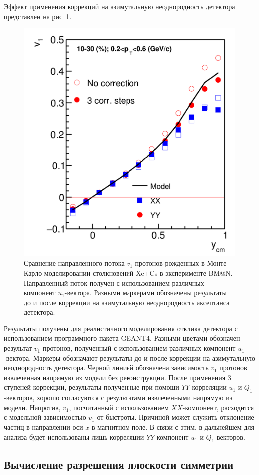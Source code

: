 Эффект применения коррекций на азимутальную неоднородность детектора представлен на рис~\ref{fig:bmn_components}.
%
\begin{figure}[ht]
\begin{center}
\includegraphics[width=0.45\linewidth]{images/v1_proton_correction_rapidity.png}
\caption{Сравнение направленного потока $v_1$ протонов рожденных в Монте-Карло моделировании столкновений Xe+Cs в эксперименте BM@N. Направленный поток получен с использованием различных компонент $u_1$-вектора. Разными маркерами обозначены результаты до и после коррекции на азимутальную неоднородность аксептанса детектора. }
\label{fig:bmn_components}
\end{center}
\end{figure}

Результаты получены для реалистичного моделирования отклика детектора с использованием программного пакета GEANT4.
Разными цветами обозначен результат $v_1$ протонов, полученный с использованием различных компонент $u_1$-вектора. 
Маркеры обозначают результаты до и после коррекции на азимутальную неоднородность детектора.
Черной линией обозначена зависимость $v_1$ протонов извлеченная напрямую из модели без реконструкции.
После применения 3 ступеней коррекции, результаты полученные при помощи $YY$ корреляции $u_1$ и $Q_1$-векторов, хорошо согласуются с результатами извлеченными напрямую из модели.
Напротив, $v_1$, посчитанный с использованием $XX$-компонент, расходится с модельной зависимостью $v_1$ от быстроты. 
Причиной может служить отклонение частиц в направлении оси $x$ в магнитном поле. 
В связи с этим, в дальнейшем для анализа будет использованы лишь корреляции $YY$-компонент $u_1$ и $Q_1$-векторов.

\subsection{Вычисление разрешения плоскости симметрии}


